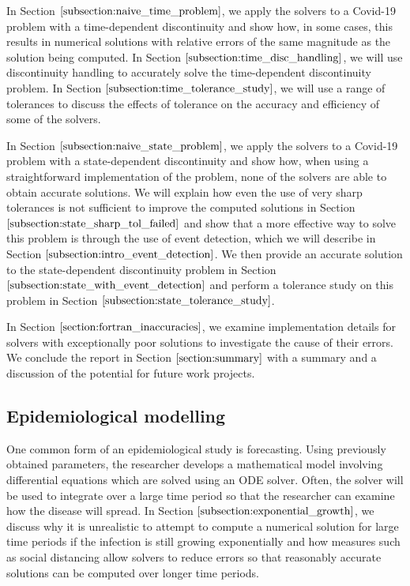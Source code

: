 In Section $\ref{subsection:naive_time_problem}$, we apply the solvers to a Covid-19 problem with a time-dependent discontinuity and show how, in some cases, this results in numerical solutions with relative errors of the same magnitude as the solution being computed. In Section $\ref{subsection:time_disc_handling}$, we will use discontinuity handling to accurately solve the time-dependent discontinuity problem. In Section $\ref{subsection:time_tolerance_study}$, we will use a range of tolerances to discuss the effects of tolerance on the accuracy and efficiency of some of the solvers.

In Section $\ref{subsection:naive_state_problem}$, we apply the solvers to a Covid-19 problem with a state-dependent discontinuity and show how, when using a straightforward implementation of the problem, none of the solvers are able to obtain accurate solutions. We will explain how even the use of very sharp tolerances is not sufficient to improve the computed solutions in Section $\ref{subsection:state_sharp_tol_failed}$ and show that a more effective way to solve this problem is through the use of event detection, which we will describe in Section $\ref{subsection:intro_event_detection}$. We then provide an accurate solution to the state-dependent discontinuity problem in Section $\ref{subsection:state_with_event_detection}$ and perform a tolerance study on this problem in Section $\ref{subsection:state_tolerance_study}$.

In Section $\ref{section:fortran_inaccuracies}$, we examine implementation details for solvers with exceptionally poor solutions to investigate the cause of their errors. We conclude the report in Section $\ref{section:summary}$ with a summary and a discussion of the potential for future work projects.

\subsection{Epidemiological modelling}
\label{subsection:research_papers}
One common form of an epidemiological study is forecasting. Using previously obtained parameters, the researcher develops a mathematical model involving differential equations which are solved using an ODE solver. Often, the solver will be used to integrate over a large time period so that the researcher can examine how the disease will spread. In Section $\ref{subsection:exponential_growth}$, we discuss why it is unrealistic to attempt to compute a numerical solution for large time periods if the infection is still growing exponentially and how measures such as social distancing allow solvers to reduce errors so that reasonably accurate solutions can be computed over longer time periods.

